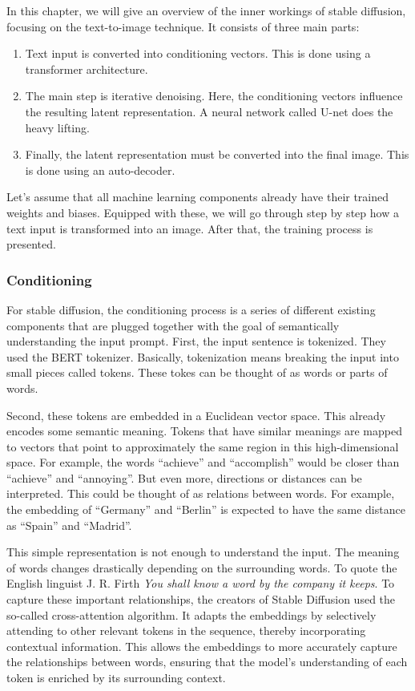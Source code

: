 \documentclass[11pt]{article}
\begin{document}
In this chapter, we will give an overview of the inner workings of stable diffusion, focusing on the text-to-image technique. It consists of three main parts:
\begin{enumerate}
    \item Text input is converted into conditioning vectors. This is done using a transformer architecture.
    \item The main step is iterative denoising. Here, the conditioning vectors influence the resulting latent representation. A neural network called U-net does the heavy lifting.
    \item Finally, the latent representation must be converted into the final image. This is done using an auto-decoder.
\end{enumerate}

Let's assume that all machine learning components already have their trained weights and biases. Equipped with these, we will go through step by step how a text input is transformed into an image. After that, the training process is presented.

\subsubsection{Conditioning}
For stable diffusion, the conditioning process is a series of different existing components that are plugged together with the goal of semantically understanding the input prompt. First, the input sentence is tokenized. They used the BERT tokenizer\cite{devlin2019bert}. Basically, tokenization means breaking the input into small pieces called tokens. These tokes can be thought of as words or parts of words.

Second, these tokens are embedded in a Euclidean vector space. This already encodes some semantic meaning. Tokens that have similar meanings are mapped to vectors that point to approximately the same region in this high-dimensional space. For example, the words ``achieve'' and ``accomplish'' would be closer than ``achieve'' and ``annoying''. But even more, directions or distances can be interpreted. This could be thought of as relations between words. For example, the embedding of ``Germany'' and ``Berlin'' is expected to have the same distance as ``Spain'' and ``Madrid''.

This simple representation is not enough to understand the input. The meaning of words changes drastically depending on the surrounding words. To quote the English linguist J. R. Firth \textit{You shall know a word by the company it keeps}\cite{firth1962studiesinlinguisticanalysis}. To capture these important relationships, the creators of Stable Diffusion used the so-called cross-attention algorithm\cite{vaswani2023attentionneed}. It adapts the embeddings by selectively attending to other relevant tokens in the sequence, thereby incorporating contextual information. This allows the embeddings to more accurately capture the relationships between words, ensuring that the model's understanding of each token is enriched by its surrounding context.
\end{document}
